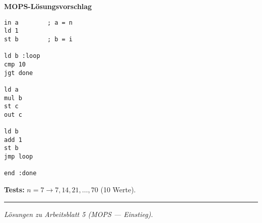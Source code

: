 \documentclass[11pt,a4paper]{scrartcl}
\begin{document}
\begin{enumerate}[leftmargin=*,label=\textbf{Aufgabe~\arabic*:}, itemsep=1.0em, start=5]
\textbf{MOPS-Lösungsvorschlag}
\begin{verbatim}
in a        ; a = n
ld 1
st b        ; b = i

ld b :loop
cmp 10
jgt done

ld a
mul b
st c
out c

ld b
add 1
st b
jmp loop

end :done
\end{verbatim}

\textbf{Tests:} $n=7 \to 7,14,21,\dots,70$ (10 Werte).

\end{enumerate}

\vfill
\hrule
\small\emph{Lösungen zu Arbeitsblatt 5 (MOPS — Einstieg).}
\end{document}
